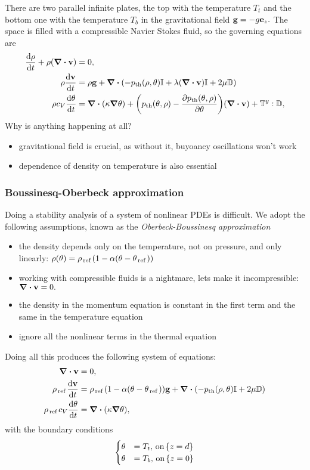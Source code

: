 \documentclass[../main.tex]{subfiles}
\begin{document}
There are two parallel infinite plates, the top with the temperature $T_t$ and the bottom one with the temperature $T_b$ in the gravitational field $\vb{g}= - g \vb{e}_z.$ The space is filled with a compressible Navier Stokes fluid, so the governing equations are
\begin{align*}
	\dv{\rho}{t} + \rho \qty(\divergence{\vb{v}}) &= 0, \\
	\rho \dv{\vb{v}}{t} &= \rho \vb{g} + \divergence{\qty(-\pth\qty(\rho, \theta)\identity + \lambda \qty(\divergence{\vb{v}})\identity + 2 \mu \symvgrad)} \\
	\rho c_{V}\dv{\theta}{t} &= \divergence{\qty(\kappa \grad \theta)}+\qty(\pth\qty(\theta, \rho)-\pdv{\pth\qty(\theta, \rho)}{\theta})\qty(\divergence{\vb{v}}) + \cstress : \symvgrad,
\end{align*}
Why is anything happening at all?
\begin{itemize}
	\item gravitational field is crucial, as without it, buyoancy oscillations won't work
	\item dependence of density on temperature is also essential
\end{itemize}

\subsubsection{Boussinesq-Oberbeck approximation}
\label{sec:boussinesq_approximation}
Doing a stability analysis of a system of nonlinear PDEs is difficult. We adopt the following assumptions, known as the \textit{Oberbeck-Boussinesq approximation}

\begin{itemize}
	\item the density depends only on the temperature, not on pressure, and only linearly: $\rho(\theta) = \rho_{\, \text{ref} \,}\qty(1- \alpha\qty(\theta - \theta_{\, \text{ref} \,}))$
	\item working with compressible fluids is a nightmare, lets make it incompressible: $\divergence{\vb{v}} = 0.$
	\item the density in the momentum equation is constant in the first term and the same in the temperature equation
	\item ignore all the nonlinear terms in the thermal equation
\end{itemize}
Doing all this produces the following system of equations:
\begin{align}
	\label{eq:ober_boussinesq}
	\divergence{\vb{v}} &= 0, \\
	\rho_{\, \text{ref} \,} \dv{\vb{v}}{t} &= \rho_{\, \text{ref} \,}\qty(1- \alpha\qty(\theta-\theta_{\, \text{ref} \,})) \vb{g} + \divergence{\qty(-\pth\qty(\rho, \theta)\identity +  2 \mu \symvgrad)} \\
	\rho_{\, \text{ref} \,} c_{V}\dv{\theta}{t} &= \divergence{\qty(\kappa \grad \theta)},
\end{align}
with the boundary conditions
\[
	\begin{cases}
		\theta &=T_{t}, \, \text{on} \, \qty{z=d} \\
		\theta &=T_{b}, \, \text{on} \,\qty{z=0}
	\end{cases}
\]
\end{document}
